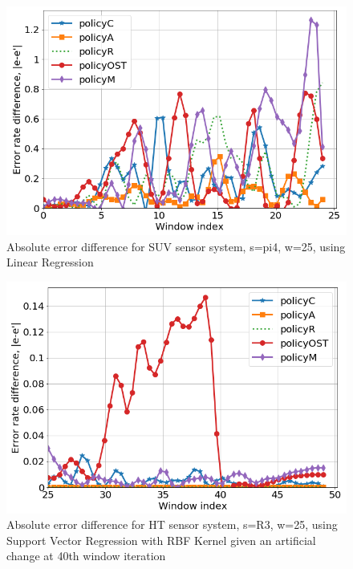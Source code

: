 \documentclass{mpaper}
\begin{document}
\begin{figure}[h]
    \centering
    \includegraphics[scale=0.3]{imgs/lin_reg_pi4_w25.png}
    \caption{Absolute error difference for SUV sensor system, s=pi4, w=25, using Linear Regression}
    \label{fig:err_lin_reg_pi4}
\end{figure}

\begin{figure}[h]
    \centering
    \includegraphics[scale=0.3]{imgs/svr_rbf_R3_w25.png}
    \caption{Absolute error difference for HT sensor system, s=R3, w=25,
    using Support Vector Regression with RBF Kernel 
    given an artificial change at 40th window iteration}
    \label{fig:err_rbf_svr_R3}
\end{figure}
\end{document}
